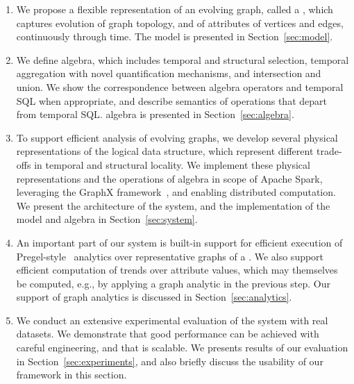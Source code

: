 \begin{enumerate}[noitemsep,leftmargin=*]

\item We propose a flexible representation of an evolving graph,
  called a \tg, which captures evolution of graph topology, and of
  attributes of vertices and edges, continuously through time.  The \tg model is presented in
  Section~\ref{sec:model}.

\item We define \tg algebra, which includes temporal and structural
  selection, temporal aggregation with novel quantification
  mechanisms, and \tg intersection and union.  We show the
  correspondence between \tg algebra operators and temporal SQL when
  appropriate, and describe semantics of operations that depart from
  temporal SQL.  \tg algebra is presented in
  Section~\ref{sec:algebra}.

\item To support efficient analysis of evolving graphs, we develop
  several physical representations of the logical \tg data structure,
  which represent different trade-offs in temporal and structural
  locality.  We implement these physical representations and the
  operations of \tg algebra in scope of Apache Spark, leveraging the
  GraphX framework~\cite{DBLP:conf/osdi/GonzalezXDCFS14}, and enabling
  distributed computation. We present the architecture of the \ql
  system, and the implementation of the \tg model and algebra in
  Section~\ref{sec:system}.

\item An important part of our system is built-in support for
  efficient execution of
  Pregel-style~\cite{DBLP:conf/sigmod/MalewiczABDHLC10} analytics over
  representative graphs of a \tg.  We also support efficient
  computation of trends over attribute values, which may themselves be
  computed, e.g., by applying a graph analytic in the previous step.
  Our support of graph analytics is discussed in
  Section~\ref{sec:analytics}.

\item We conduct an extensive experimental evaluation of the \ql
  system with real datasets.  We demonstrate that good performance can
  be achieved with careful engineering, and that \ql is scalable.  We
  presents results of our evaluation in Section~\ref{sec:experiments},
  and also briefly discuss the usability of our framework in this
  section.

\end{enumerate}

